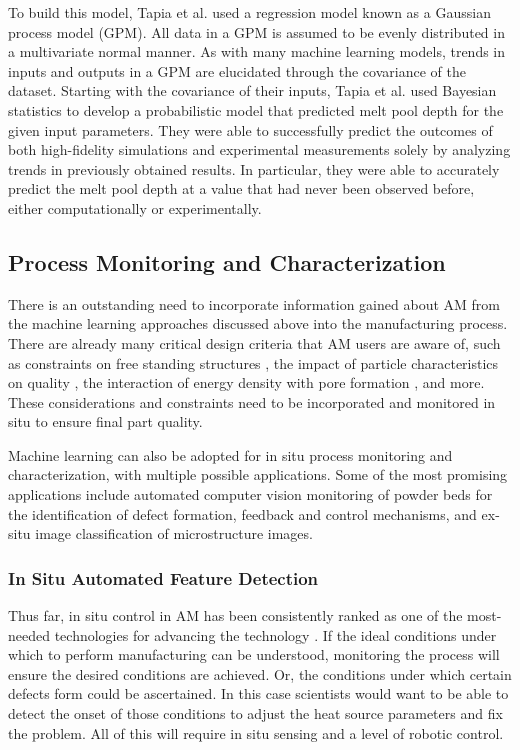 To build this model, Tapia et al. used a regression model known as a Gaussian process model (GPM). All data in a GPM is assumed to be evenly distributed in a multivariate normal manner. As with many machine learning models, trends in inputs and outputs in a GPM are elucidated through the covariance of the dataset. Starting with the covariance of their inputs, Tapia et al. used Bayesian statistics to develop a probabilistic model that predicted melt pool depth for the given input parameters. They were able to successfully predict the outcomes of both high-fidelity simulations and experimental measurements solely by analyzing trends in previously obtained results. In particular, they were able to accurately predict the melt pool depth at a value that had never been observed before, either computationally or experimentally. 

\subsection{Process Monitoring and Characterization}
There is an outstanding need to incorporate information gained about AM from the machine learning approaches discussed above into the manufacturing process. There are already many critical design criteria that AM users are aware of, such as constraints on free standing structures \cite{Gaynor2016}, the impact of particle characteristics on quality \cite{Deng2018, Ziolkowski2014}, the interaction of energy density with pore formation \cite{King2014, Cherry2015}, and more. These considerations and constraints need to be incorporated and monitored in situ to ensure final part quality. 

Machine learning can also be adopted for in situ process monitoring and characterization, with multiple possible applications. Some of the most promising applications include automated computer vision monitoring of powder beds for the identification of defect formation, feedback and control mechanisms, and ex-situ image classification of microstructure images.

\subsubsection{In Situ Automated Feature Detection}
Thus far, in situ control in AM has been consistently ranked as one of the most-needed technologies for advancing the technology \cite{Mani2017, Tapia2014}. If the ideal conditions under which to perform manufacturing can be understood, monitoring the process will ensure the desired conditions are achieved. Or, the conditions under which certain defects form could be ascertained. In this case scientists would want to be able to detect the onset of those conditions to adjust the heat source parameters and fix the problem. All of this will require in situ sensing and a level of robotic control. 

